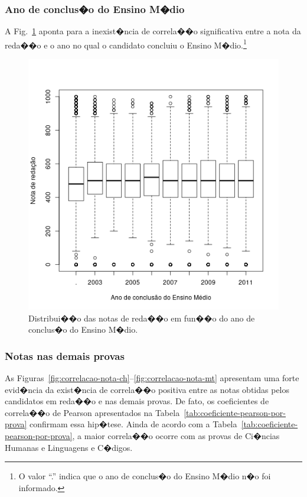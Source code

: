 \documentclass[12pt]{article}
\newcommand{\reffig}[1]{Fig.~\ref{fig:#1}}
\newcommand{\reftab}[1]{Tabela~\ref{tab:#1}}
\begin{document}
\subsubsection{Ano de conclus�o do Ensino M�dio}
A \reffig{correlacao-ano-concluiu} aponta para a inexist�ncia de correla��o significativa entre a nota da reda��o e o ano no qual o candidato concluiu o Ensino M�dio.\footnote{O valor ``.'' indica que o ano de conclus�o do Ensino M�dio n�o foi informado.}
\begin{figure}[H]
\centering\includegraphics[width=.44\linewidth]{../correlacao_ano_concluiu.png}
\caption{Distribui��o das notas de reda��o em fun��o do ano de conclus�o do Ensino M�dio.}
\label{fig:correlacao-ano-concluiu}
\end{figure}

\subsubsection{Notas nas demais provas}
As Figuras~\ref{fig:correlacao-nota-ch}--\ref{fig:correlacao-nota-mt} apresentam uma forte evid�ncia da exist�ncia de correla��o positiva entre as notas obtidas pelos candidatos em reda��o e nas demais provas.
De fato, os coeficientes de correla��o de Pearson apresentados na \reftab{coeficiente-pearson-por-prova} confirmam essa hip�tese.
Ainda de acordo com a \reftab{coeficiente-pearson-por-prova}, a maior correla��o ocorre com as provas de Ci�ncias Humanas e Linguagens e C�digos.
\end{document}
